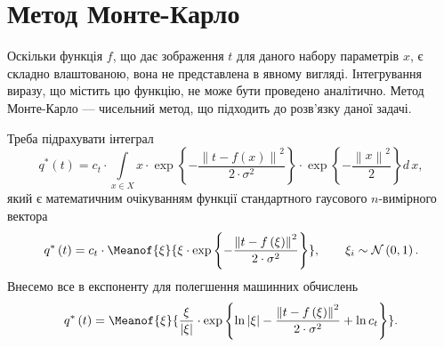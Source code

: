 \section{Метод Монте-Карло}

Оскільки функція $f$, що дає зображення $t$ для даного набору параметрів $x$,
є складно влаштованою, вона не представлена в явному вигляді.
Інтегрування виразу, що містить цю функцію, не може бути проведено аналітично.
Метод Монте-Карло --- чисельний метод, що підходить до розв'язку даної задачі.

Треба підрахувати інтеграл
\begin{equation*}
  q^* \left( t \right)
  = c_t
    \cdot \int\limits_{x \in X}
      x
      \cdot \exp{\left\{ - \frac{\left\| t - f\left( x \right) \right\|^2}
                                {2 \cdot \sigma^2} \right\}}
      \cdot \exp{\left\{ - \frac{\left\| x \right\|^2}{2} \right\}}
    d\,x,
\end{equation*}
який є математичним очікуванням функції
стандартного гаусового $n$-вимірного вектора
\begin{equation*}
  q^* \left( t \right)
  = c_t
    \cdot \Meanof{\xi}{
      \xi
      \cdot \exp{\left\{
          - \frac{\left\| t - f\left( \xi \right) \right\|^2}
                 {2 \cdot \sigma^2}
            \right\}}}, \qquad
    \xi_i \sim \mathcal{N}\left( 0, 1 \right).
\end{equation*}
Внесемо все в експоненту для полегшення машинних обчислень
\begin{equation*}
  q^* \left( t \right)
  = \Meanof{\xi}{
    \frac{\xi}{\left| \xi \right|}
    \cdot \exp{\left\{
        \ln{\left| \xi \right|}
        - \frac{\left\| t - f\left( \xi \right) \right\|^2}{2 \cdot \sigma^2}
        + \ln{c_t}
       \right\}
    }}.
\end{equation*}


